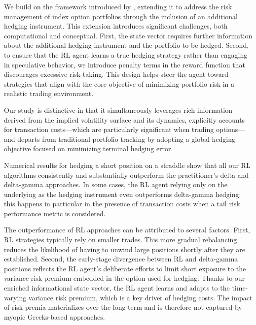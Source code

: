 \documentclass[12pt]{article}
\def\boxit#1{\vbox{\hrule\hbox{\vrule\kern6pt
          \vbox{\kern6pt#1\kern6pt}\kern6pt\vrule}\hrule}}
\def\fredcomment#1{\vskip 2mm\boxit{\vskip 2mm{\color{MyDarkBlue}\bf#1}
{\color{MyDarkBlue}\bf -- Fred\vskip 2mm}}\vskip 2mm}
\def\boxit#1{\vbox{\hrule\hbox{\vrule\kern6pt
          \vbox{\kern6pt#1\kern6pt}\kern6pt\vrule}\hrule}}
\def\fredcomment#1{\vskip 2mm\boxit{\vskip 2mm{\color{MyDarkBlue}\bf#1}
{\color{MyDarkBlue}\bf -- Fred\vskip 2mm}}\vskip 2mm}
\begin{document}
We build on the framework introduced by \cite{François2025}, extending it to address the risk management of index option portfolios through the inclusion of an additional hedging instrument.
This extension introduces significant challenges, both computational and conceptual. First, the state vector requires further information about the additional hedging instrument and the portfolio to be hedged. 
Second, to ensure that the RL agent learns a true hedging strategy rather than engaging in speculative behavior, we introduce penalty terms in the reward function that discourages excessive risk-taking. This design helps steer the agent toward strategies that align with the core objective of minimizing portfolio risk in a realistic trading environment.

Our study is distinctive in that it simultaneously leverages rich information derived from the implied volatility surface and its dynamics, explicitly accounts for transaction costs—which are particularly significant when trading options—and departs from traditional portfolio tracking by adopting a global hedging objective focused on minimizing terminal hedging error.

Numerical results for hedging a short position on a straddle show that all our RL algorithms consistently and substantially outperform the practitioner's delta and delta-gamma approaches.
In some cases, the RL agent relying only on the underlying as the hedging instrument even outperforms delta-gamma hedging: this happens in particular in the presence of transaction costs when a tail risk performance metric is considered. 

The outperformance of RL approaches can be attributed to several factors. First, RL strategies typically rely on smaller trades. This more gradual rebalancing reduces the likelihood of having to unwind large positions shortly after they are established. Second, the early-stage divergence between RL and delta-gamma positions reflects the RL agent’s deliberate efforts to limit short exposure to the variance risk premium embedded in the option used for hedging.
Thanks to our enriched informational state vector, the RL agent learns and adapts to the time-varying variance risk premium, which is a key driver of hedging costs. 
The impact of risk premia materializes over the long term and is therefore not captured by myopic Greeks-based approaches.
\end{document}
